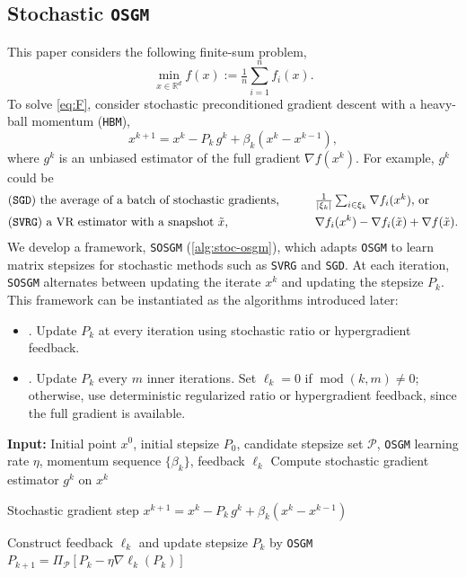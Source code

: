 \documentclass{article}
\theoremstyle{definition}
\DeclareRobustCommand{\namerefc}[2]{\hyperref[#2]{\textcolor{#1}{\nameref*{#2}}}}
\newcommand{\sosgm}{\texttt{SOSGM}}
\newcommand{\ov}{\namerefc{purple}{alg:osgm-svrg}}
\newcommand{\osgd}{\namerefc{purple}{alg:sosgm}}
\newcommand{\assign}{:=}
\newcommand{\os}{\texttt{OSGM}}
\newcommand{\svrg}{\texttt{SVRG}}
\newcommand{\sgd}{\texttt{SGD}}
\newcommand{\hbm}{\texttt{HBM}}
\begin{document}
\subsection{Stochastic {\os}}

This paper considers the following finite-sum problem,
\begin{equation}\label{eq:F}
  \min_{x\in \mathbb{R}^d} f (x) \assign \tfrac{1}{n}  \textstyle \sum_{i = 1}^n f_i (x).
\end{equation}
To solve \eqref{eq:F}, consider stochastic preconditioned gradient descent with a heavy-ball momentum ({\hbm}),
\begin{equation*}
  x^{k+1} = x^k - P_k \, g^k + \beta_k (x^k - x^{k-1}),
\end{equation*}
where $g^k$ is an unbiased estimator of the full gradient $\nabla f(x^k)$. 
For example, $g^k$ could be 
\begin{align*}
& \text{({\sgd}) the average of a batch of stochastic gradients,} \qquad   &&\tfrac{1}{|\xi_k|} \textstyle \sum_{i \in \xi_k} \nabla f_i (x^k),\, \text{or} \\
& \text{({\svrg}) a VR estimator with a snapshot $\tilde x$,} \qquad  &&\nabla f_i (x^k) - \nabla f_i (\tilde x) + \nabla f (\tilde x).
\end{align*}
We develop a framework, {\sosgm} (\cref{alg:stoc-osgm}), which adapts {\os} to learn matrix stepsizes for stochastic methods such as {\svrg} and {\sgd}.
At each iteration, {\sosgm} alternates between updating the iterate $x^k$ and updating the stepsize $P_k$.
This framework can be instantiated as the algorithms introduced later:
\begin{itemize}
  \item {\osgd}. Update $P_k$ at every iteration using stochastic ratio or hypergradient feedback.
  \item {\ov}. Update $P_k$ every $m$ inner iterations. Set $\ell_k = 0$ if $\operatorname{mod}(k,m)\neq 0$; otherwise, use deterministic regularized ratio or hypergradient feedback, since the full gradient is available.
\end{itemize}

\begin{algorithm}[h]
\caption{\sosgm}
\label{alg:stoc-osgm}
\begin{algorithmic}[1]
\STATE \textbf{Input:} Initial point $x^0$, initial stepsize $P_0$, candidate stepsize set $\mathcal{P}$, {\os} learning rate $\eta$, \quad momentum sequence $\{\beta_k\}$,
    feedback $\ell_{k}$
        \STATE Compute stochastic gradient estimator $g^k$ on $x^k$

        \STATE Stochastic gradient step
        $x^{k+1}=x^k - P_k \, g^k + \beta_k (x^k - x^{k-1})$

        \STATE Construct feedback $\ell_{k}$ and update stepsize $P_k$ by {\os}
        $P_{k+1} = \Pi_{\mathcal{P}} [P_k - \eta \nabla \ell_{k}(P_k)]$
        
    \ENDFOR
\end{algorithmic}
\end{algorithm}
\end{document}
